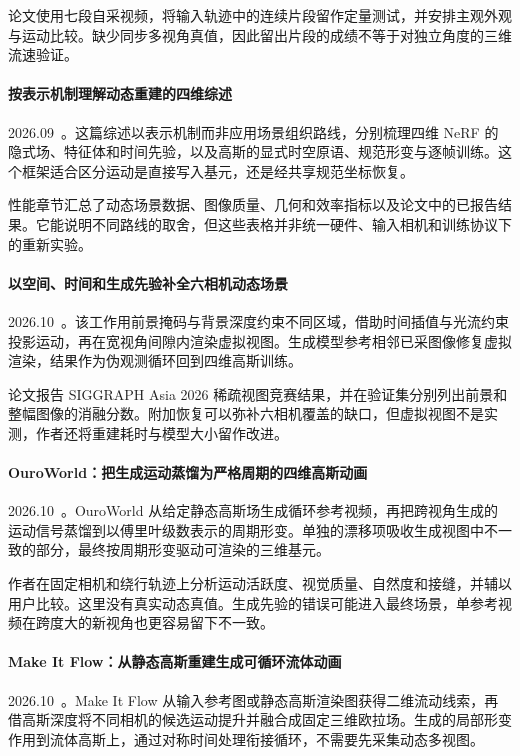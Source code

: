 论文使用七段自采视频，将输入轨迹中的连续片段留作定量测试，并安排主观外观与运动比较。缺少同步多视角真值，因此留出片段的成绩不等于对独立角度的三维流速验证。

\paragraph{按表示机制理解动态重建的四维综述}
2026.09~\cite{2609_39960}。这篇综述以表示机制而非应用场景组织路线，分别梳理四维 NeRF 的隐式场、特征体和时间先验，以及高斯的显式时空原语、规范形变与逐帧训练。这个框架适合区分运动是直接写入基元，还是经共享规范坐标恢复。

性能章节汇总了动态场景数据、图像质量、几何和效率指标以及论文中的已报告结果。它能说明不同路线的取舍，但这些表格并非统一硬件、输入相机和训练协议下的重新实验。

\paragraph{以空间、时间和生成先验补全六相机动态场景}
2026.10~\cite{2610_04606}。该工作用前景掩码与背景深度约束不同区域，借助时间插值与光流约束投影运动，再在宽视角间隙内渲染虚拟视图。生成模型参考相邻已采图像修复虚拟渲染，结果作为伪观测循环回到四维高斯训练。

论文报告 SIGGRAPH Asia 2026 稀疏视图竞赛结果，并在验证集分别列出前景和整幅图像的消融分数。附加恢复可以弥补六相机覆盖的缺口，但虚拟视图不是实测，作者还将重建耗时与模型大小留作改进。

\paragraph{OuroWorld：把生成运动蒸馏为严格周期的四维高斯动画}
2026.10~\cite{2610_12461}。OuroWorld 从给定静态高斯场生成循环参考视频，再把跨视角生成的运动信号蒸馏到以傅里叶级数表示的周期形变。单独的漂移项吸收生成视图中不一致的部分，最终按周期形变驱动可渲染的三维基元。

作者在固定相机和绕行轨迹上分析运动活跃度、视觉质量、自然度和接缝，并辅以用户比较。这里没有真实动态真值。生成先验的错误可能进入最终场景，单参考视频在跨度大的新视角也更容易留下不一致。

\paragraph{Make It Flow：从静态高斯重建生成可循环流体动画}
2026.10~\cite{2610_13860}。Make It Flow 从输入参考图或静态高斯渲染图获得二维流动线索，再借高斯深度将不同相机的候选运动提升并融合成固定三维欧拉场。生成的局部形变作用到流体高斯上，通过对称时间处理衔接循环，不需要先采集动态多视图。

